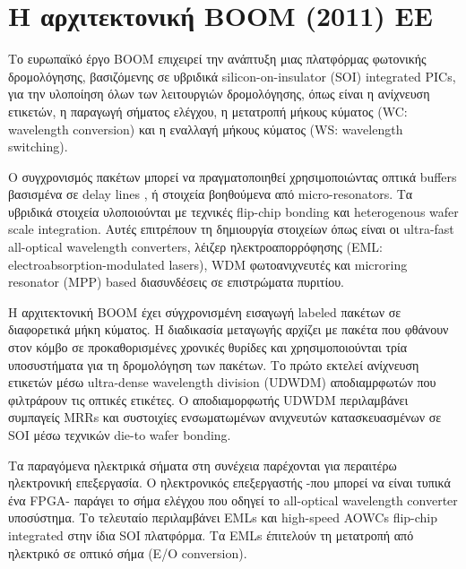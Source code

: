  
\section{Η αρχιτεκτονική BOOM (2011) ΕΕ}



Tο ευρωπαϊκό έργο BOOM επιχειρεί την ανάπτυξη μιας πλατφόρμας
φωτονικής δρομολόγησης, βασιζόμενης σε υβριδικά silicon-on-insulator
(SOI) integrated PICs, για την υλοποίηση όλων των λειτουργιών
δρομολόγησης, όπως είναι η ανίχνευση ετικετών, η παραγωγή σήματος
ελέγχου, η μετατροπή μήκους κύματος (WC: wavelength conversion) και η
εναλλαγή μήκους κύματος (WS: wavelength switching).

Ο συγχρονισμός πακέτων μπορεί να πραγματοποιηθεί χρησιμοποιώντας
οπτικά buffers βασισμένα σε delay lines \cite{5685653}, ή στοιχεία
βοηθούμενα από micro-resonators. Τα υβριδικά στοιχεία υλοποιούνται με
τεχνικές flip-chip bonding και heterogenous wafer scale integration.
Αυτές επιτρέπουν τη δημιουργία στοιχείων όπως είναι οι ultra-fast
all-optical wavelength converters, λέιζερ ηλεκτροαπορρόφησης (EML:
electroabsorption-modulated lasers), WDM φωτοανιχνευτές και microring
resonator (ΜΡΡ) based διασυνδέσεις σε επιστρώματα πυριτίου.

H αρχιτεκτονική BOOM έχει σύγχρονισμένη εισαγωγή labeled πακέτων σε
διαφορετικά μήκη κύματος. Η διαδικασία μεταγωγής αρχίζει με πακέτα που
φθάνουν στον κόμβο σε προκαθορισμένες χρονικές θυρίδες και
χρησιμοποιούνται τρία υποσυστήματα για τη δρομολόγηση των πακέτων.  Το
πρώτο εκτελεί ανίχνευση ετικετών μέσω ultra-dense wavelength division
(UDWDM) αποδιαμρφωτών που φιλτράρουν τις οπτικές ετικέτες. Ο
αποδιαμορφωτής UDWDM περιλαμβάνει συμπαγείς MRRs και συστοιχίες
ενσωματωμένων ανιχνευτών κατασκευασμένων σε SOI μέσω τεχνικών die-to
wafer bonding.

Τα παραγόμενα ηλεκτρικά σήματα στη συνέχεια παρέχονται για περαιτέρω
ηλεκτρονική επεξεργασία.  Ο ηλεκτρονικός επεξεργαστής -που μπορεί να
είναι τυπικά ένα FPGA- παράγει το σήμα ελέγχου που οδηγεί το
all-optical wavelength converter υποσύστημα. Το τελευταίο περιλαμβάνει
EMLs και high-speed AOWCs flip-chip integrated στην ίδια SOI
πλατφόρμα. Τα EMLs έπιτελούν τη μετατροπή από ηλεκτρικό σε οπτικό σήμα
(E/O conversion).


